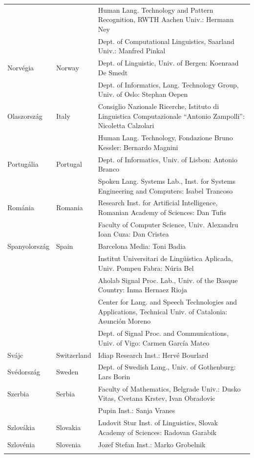 \begin{longtable}{llp{105mm}}
    & & Human Lang. Technology and Pattern Recognition, RWTH Aachen Univ.: Hermann Ney \\ \addlinespace
    & & Dept. of Computational Linguistics, Saarland Univ.: Manfred Pinkal\\ \addlinespace
    Norvégia & \textcolor{grey1}{Norway} & Dept. of Linguistic, Univ. of Bergen: Koenraad De Smedt\\ \addlinespace 
    & & Dept. of Informatics, Lang. Technology Group, Univ. of Oslo: Stephan Oepen \\ \addlinespace
    Olaszország & \textcolor{grey1}{Italy} & Consiglio Nazionale Ricerche, Istituto di Linguistica Computazionale “Antonio Zampolli”: Nicoletta Calzolari\\ \addlinespace
    & & Human Lang. Technology, Fondazione Bruno Kessler: Bernardo Magnini\\ \addlinespace
    Portugália & \textcolor{grey1}{Portugal} & Dept. of Informatics, Univ. of Lisbon: Antonio Branco\\ \addlinespace
    & & Spoken Lang. Systems Lab., Inst. for Systems Engineering and Computers: Isabel Trancoso \\ \addlinespace
    Románia & \textcolor{grey1}{Romania} & Research Inst. for Artificial Intelligence, Romanian Academy of Sciences: Dan Tufis \\ \addlinespace
    & & Faculty of Computer Science, Univ. Alexandru Ioan Cuza: Dan Cristea \\ \addlinespace
    Spanyolország & \textcolor{grey1}{Spain} & Barcelona Media: Toni Badia \\ \addlinespace 
    & & Institut Universitari de Lingüistica Aplicada, Univ. Pompeu Fabra: Núria Bel \\ \addlinespace 
    & & Aholab Signal Proc. Lab., Univ. of the Basque Country: Inma Hernaez Rioja \\ \addlinespace 
    & & Center for Lang. and Speech Technologies and Applications, Technical Univ. of Catalonia: Asunción Moreno \\ \addlinespace 
    & & Dept. of Signal Proc. and Communications, Univ. of Vigo: Carmen García Mateo \\ \addlinespace
    Svájc & \textcolor{grey1}{Switzerland} & Idiap Research Inst.: Hervé Bourlard \\ \addlinespace
    Svédország & \textcolor{grey1}{Sweden} & Dept. of Swedish Lang., Univ. of Gothenburg: Lars Borin \\ \addlinespace 
    Szerbia & \textcolor{grey1}{Serbia} & Faculty of Mathematics, Belgrade Univ.: Dusko Vitas, Cvetana Krstev, Ivan Obradovic \\ \addlinespace
    & & Pupin Inst.: Sanja Vranes \\ \addlinespace  
    Szlovákia & \textcolor{grey1}{Slovakia} & Ludovit Stur Inst. of Linguistics, Slovak Academy of Sciences: Radovan Garabik \\ \addlinespace 
    Szlovénia & \textcolor{grey1}{Slovenia} & Jozef Stefan Inst.: Marko Grobelnik \\ \addlinespace 
  \end{longtable}
  \normalsize

